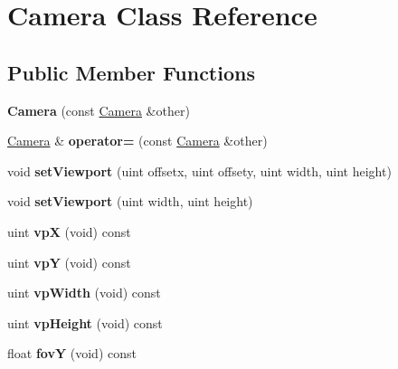 \hypertarget{class_camera}{}\section{Camera Class Reference}
\label{class_camera}
\subsection*{Public Member Functions}
\begin{DoxyCompactItemize}
\item 
\mbox{\label{class_camera_ad491e80e8096db31be3d6095475ff3f3}} 
{\bfseries Camera} (const \hyperlink{class_camera}{Camera} \&other)
\item 
\mbox{\label{class_camera_ac4436b6f6c5ada8ac1a2062d1b87f524}} 
\hyperlink{class_camera}{Camera} \& {\bfseries operator=} (const \hyperlink{class_camera}{Camera} \&other)
\item 
\mbox{\label{class_camera_ad33fa87402ee280ac0194fd062b570bd}} 
void {\bfseries set\+Viewport} (uint offsetx, uint offsety, uint width, uint height)
\item 
\mbox{\label{class_camera_a7c1b847ed9fd5dfd3dcf3017160b1825}} 
void {\bfseries set\+Viewport} (uint width, uint height)
\item 
\mbox{\label{class_camera_a0462fcbd95a3e7cfef772cec82b58abe}} 
uint {\bfseries vpX} (void) const
\item 
\mbox{\label{class_camera_ad5c56d0e29df685bbe62bc9b77a52b1c}} 
uint {\bfseries vpY} (void) const
\item 
\mbox{\label{class_camera_a284a34e208b7ddbd41fb306647f6818f}} 
uint {\bfseries vp\+Width} (void) const
\item 
\mbox{\label{class_camera_a03cd0c3febe3a446b1c7bdbc060d3031}} 
uint {\bfseries vp\+Height} (void) const
\item 
\mbox{\label{class_camera_a0942e5c257ca57e6e6e000bde9dc0595}} 
float {\bfseries fovY} (void) const
\item 

\end{DoxyCompactItemize}
